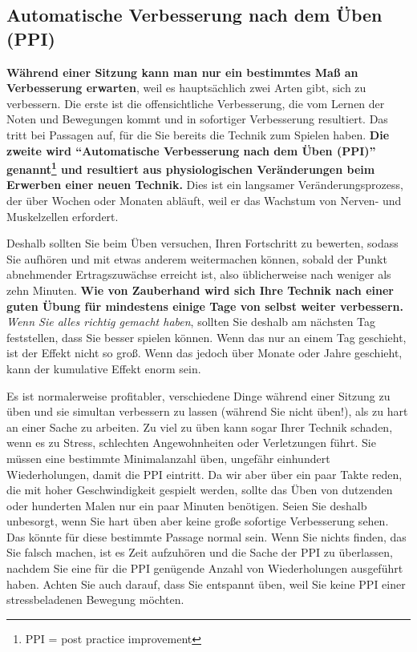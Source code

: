 
\subsection{Automatische Verbesserung nach dem Üben (PPI)}
\label{c1ii15}

\textbf{Während einer Sitzung kann man nur ein bestimmtes Maß an Verbesserung erwarten}, weil es hauptsächlich zwei Arten gibt, sich zu verbessern.
Die erste ist die offensichtliche Verbesserung, die vom Lernen der Noten und Bewegungen kommt und in sofortiger Verbesserung resultiert.
Das tritt bei Passagen auf, für die Sie bereits die Technik zum Spielen haben.
\textbf{Die zweite wird \enquote{Automatische Verbesserung nach dem Üben (PPI)} genannt\footnote{PPI = post practice improvement} und resultiert aus physiologischen Veränderungen beim Erwerben einer neuen Technik.}
Dies ist ein langsamer Veränderungsprozess, der über Wochen oder Monaten abläuft, weil er das Wachstum von Nerven- und Muskelzellen erfordert.

Deshalb sollten Sie beim Üben versuchen, Ihren Fortschritt zu bewerten, sodass Sie aufhören und mit etwas anderem weitermachen können, sobald der Punkt abnehmender Ertragszuwächse erreicht ist, also üblicherweise nach weniger als zehn Minuten.
\textbf{Wie von Zauberhand wird sich Ihre Technik nach einer guten Übung für mindestens einige Tage von selbst weiter verbessern.}
\textit{Wenn Sie alles richtig gemacht haben}, sollten Sie deshalb am nächsten Tag feststellen, dass Sie besser spielen können.
Wenn das nur an einem Tag geschieht, ist der Effekt nicht so groß. Wenn das jedoch über Monate oder Jahre geschieht, kann der kumulative Effekt enorm sein.

Es ist normalerweise profitabler, verschiedene Dinge während einer Sitzung zu üben und sie simultan verbessern zu lassen (während Sie nicht üben!), als zu hart an einer Sache zu arbeiten.
Zu viel zu üben kann sogar Ihrer Technik schaden, wenn es zu Stress, schlechten Angewohnheiten oder Verletzungen führt.
Sie müssen eine bestimmte Minimalanzahl üben, ungefähr einhundert Wiederholungen, damit die PPI eintritt.
Da wir aber über ein paar Takte reden, die mit hoher Geschwindigkeit gespielt werden, sollte das Üben von dutzenden oder hunderten Malen nur ein paar Minuten benötigen.
Seien Sie deshalb unbesorgt, wenn Sie hart üben aber keine große sofortige Verbesserung sehen.
Das könnte für diese bestimmte Passage normal sein.
Wenn Sie nichts finden, das Sie falsch machen, ist es Zeit aufzuhören und die Sache der PPI zu überlassen, nachdem Sie eine für die PPI genügende Anzahl von Wiederholungen ausgeführt haben.
Achten Sie auch darauf, dass Sie entspannt üben, weil Sie keine PPI einer stressbeladenen Bewegung möchten.

